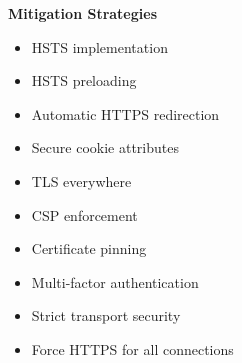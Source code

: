 \textbf{Mitigation Strategies}
\begin{itemize}
    \item HSTS implementation
    \item HSTS preloading
    \item Automatic HTTPS redirection
    \item Secure cookie attributes
    \item TLS everywhere
    \item CSP enforcement
    \item Certificate pinning
    \item Multi-factor authentication
    \item Strict transport security
    \item Force HTTPS for all connections
\end{itemize}

